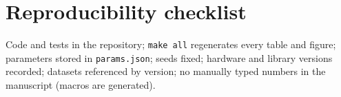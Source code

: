 \documentclass[11pt,a4paper]{article}
\begin{document}
\section{Reproducibility checklist}
{\sloppy Code and tests in the repository; \texttt{make all} regenerates every table and figure; parameters stored in \texttt{params.json}; seeds fixed; hardware and library versions recorded; datasets referenced by version; no manually typed numbers in the manuscript (macros are generated).\par}
\end{document}

